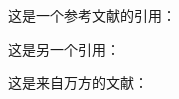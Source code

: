 \documentclass{ctexart}
\begin{document}
    这是一个参考文献的引用： \cite{mittelbach2004}
    
    这是另一个引用： \cite{patashnik1988designing}

    这是来自万方的文献： \cite{LaTeX排版的若干策略与技巧}

    \nocite{*}
    
\end{document}
